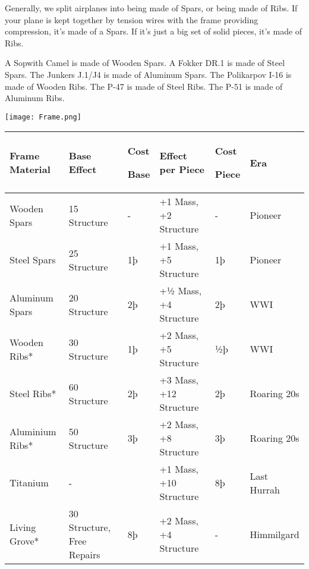 \documentclass{article}
\begin{document}
Generally, we split airplanes into being made of Spars, or being made of
Ribs. If your plane is kept together by tension wires with the frame
providing compression, it's made of a Spars. If it's just a big set of
solid pieces, it's made of Ribs.

A Sopwith Camel is made of Wooden Spars. A Fokker DR.1 is made of
Steel Spars. The Junkers J.1/J4 is made of Aluminum Spars. The
Polikarpov I-16 is made of Wooden Ribs. The P-47 is made of Steel Ribs.
The P-51 is made of Aluminum Ribs.

\texttt{[image: Frame.png]}

\begin{tabular}{|l|l|l|l|l|l|}
    \hline
    Frame Material  & Base Effect                & Cost

    Base            & Effect per Piece           & Cost

    Piece           & Era                                                                                 \\\hline
    Wooden Spars    & 15 Structure               & -          & +1 Mass, +2 Structure  & -  & Pioneer     \\\hline
    Steel Spars     & 25 Structure               & 1þ         & +1 Mass, +5 Structure  & 1þ &
    Pioneer                                                                                               \\\hline
    Aluminum Spars  & 20 Structure               & 2þ         & +½ Mass, +4 Structure  & 2þ & WWI         \\\hline
    Wooden Ribs*    & 30 Structure               & 1þ         & +2 Mass, +5 Structure  & ½þ & WWI         \\\hline
    Steel Ribs*     & 60 Structure               & 2þ         & +3 Mass, +12 Structure & 2þ & Roaring
    20s                                                                                                   \\\hline
    Aluminium Ribs* & 50 Structure               & 3þ         & +2 Mass, +8 Structure  & 3þ &
    Roaring 20s                                                                                           \\\hline
    Titanium        & -                          &            & +1 Mass, +10 Structure & 8þ & Last Hurrah \\\hline
    Living Grove*   & 30 Structure, Free Repairs & 8þ         & +2 Mass, +4 Structure
                    & -                          & Himmilgard                                             \\\hline
\end{tabular}
\end{document}

